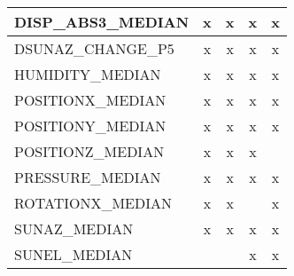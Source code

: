 \begin{table}[!htbp]
\begin{tabular}{lcccc}
        DISP\_ABS3\_MEDIAN    &      x &      x &      x &      x  \\ \hline
        DSUNAZ\_CHANGE\_P5    &      x &      x &      x &      x  \\ \hline
        HUMIDITY\_MEDIAN      &      x &      x &      x &      x  \\ \hline
        POSITIONX\_MEDIAN     &      x &      x &      x &      x  \\ \hline
        POSITIONY\_MEDIAN     &      x &      x &      x &      x  \\ \hline
        POSITIONZ\_MEDIAN     &      x &      x &      x &         \\ \hline
        PRESSURE\_MEDIAN      &      x &      x &      x &      x  \\ \hline
        ROTATIONX\_MEDIAN     &      x &      x &        &      x  \\ \hline
        SUNAZ\_MEDIAN        &      x &      x &      x &      x   \\ \hline
        SUNEL\_MEDIAN        &        &        &      x &      x   \\ \hline

    \end{tabular}        
    \label{tab:exp2_top50_features1}
\end{table}

